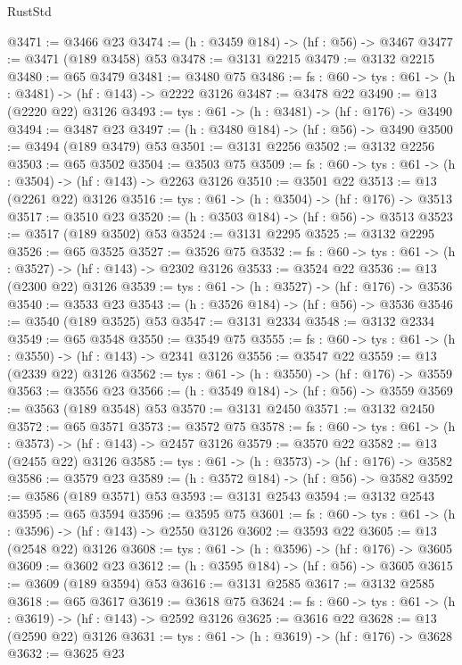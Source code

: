 \begin{lexlean}{RustStd}
\begin{coremodule}
@3471 := @3466 @23
@3474 := (h : @3459 @184) -> (hf : @56) -> @3467
@3477 := @3471 (@189 @3458) @53
@3478 := @3131 @2215
@3479 := @3132 @2215
@3480 := @65 @3479
@3481 := @3480 @75
@3486 := {fs : @60} -> {tys : @61} -> (h : @3481) -> (hf : @143) -> @2222 @3126
@3487 := @3478 @22
@3490 := @13 (@2220 @22) @3126
@3493 := {tys : @61} -> (h : @3481) -> (hf : @176) -> @3490
@3494 := @3487 @23
@3497 := (h : @3480 @184) -> (hf : @56) -> @3490
@3500 := @3494 (@189 @3479) @53
@3501 := @3131 @2256
@3502 := @3132 @2256
@3503 := @65 @3502
@3504 := @3503 @75
@3509 := {fs : @60} -> {tys : @61} -> (h : @3504) -> (hf : @143) -> @2263 @3126
@3510 := @3501 @22
@3513 := @13 (@2261 @22) @3126
@3516 := {tys : @61} -> (h : @3504) -> (hf : @176) -> @3513
@3517 := @3510 @23
@3520 := (h : @3503 @184) -> (hf : @56) -> @3513
@3523 := @3517 (@189 @3502) @53
@3524 := @3131 @2295
@3525 := @3132 @2295
@3526 := @65 @3525
@3527 := @3526 @75
@3532 := {fs : @60} -> {tys : @61} -> (h : @3527) -> (hf : @143) -> @2302 @3126
@3533 := @3524 @22
@3536 := @13 (@2300 @22) @3126
@3539 := {tys : @61} -> (h : @3527) -> (hf : @176) -> @3536
@3540 := @3533 @23
@3543 := (h : @3526 @184) -> (hf : @56) -> @3536
@3546 := @3540 (@189 @3525) @53
@3547 := @3131 @2334
@3548 := @3132 @2334
@3549 := @65 @3548
@3550 := @3549 @75
@3555 := {fs : @60} -> {tys : @61} -> (h : @3550) -> (hf : @143) -> @2341 @3126
@3556 := @3547 @22
@3559 := @13 (@2339 @22) @3126
@3562 := {tys : @61} -> (h : @3550) -> (hf : @176) -> @3559
@3563 := @3556 @23
@3566 := (h : @3549 @184) -> (hf : @56) -> @3559
@3569 := @3563 (@189 @3548) @53
@3570 := @3131 @2450
@3571 := @3132 @2450
@3572 := @65 @3571
@3573 := @3572 @75
@3578 := {fs : @60} -> {tys : @61} -> (h : @3573) -> (hf : @143) -> @2457 @3126
@3579 := @3570 @22
@3582 := @13 (@2455 @22) @3126
@3585 := {tys : @61} -> (h : @3573) -> (hf : @176) -> @3582
@3586 := @3579 @23
@3589 := (h : @3572 @184) -> (hf : @56) -> @3582
@3592 := @3586 (@189 @3571) @53
@3593 := @3131 @2543
@3594 := @3132 @2543
@3595 := @65 @3594
@3596 := @3595 @75
@3601 := {fs : @60} -> {tys : @61} -> (h : @3596) -> (hf : @143) -> @2550 @3126
@3602 := @3593 @22
@3605 := @13 (@2548 @22) @3126
@3608 := {tys : @61} -> (h : @3596) -> (hf : @176) -> @3605
@3609 := @3602 @23
@3612 := (h : @3595 @184) -> (hf : @56) -> @3605
@3615 := @3609 (@189 @3594) @53
@3616 := @3131 @2585
@3617 := @3132 @2585
@3618 := @65 @3617
@3619 := @3618 @75
@3624 := {fs : @60} -> {tys : @61} -> (h : @3619) -> (hf : @143) -> @2592 @3126
@3625 := @3616 @22
@3628 := @13 (@2590 @22) @3126
@3631 := {tys : @61} -> (h : @3619) -> (hf : @176) -> @3628
@3632 := @3625 @23

\end{coremodule}
\end{lexlean}
